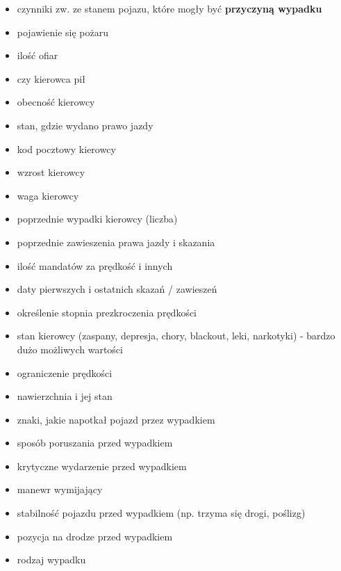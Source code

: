 \begin{itemize}
\item
  czynniki zw. ze stanem pojazu, które mogły być \textbf{przyczyną
  wypadku}\\
\item
  pojawienie się pożaru\\
\item
  ilość ofiar\\
\item
  czy kierowca pił\\
\item
  obecność kierowcy\\
\item
  stan, gdzie wydano prawo jazdy\\
\item
  kod pocztowy kierowcy\\
\item
  wzrost kierowcy\\
\item
  waga kierowcy\\
\item
  poprzednie wypadki kierowcy (liczba)\\
\item
  poprzednie zawieszenia prawa jazdy i skazania\\
\item
  ilość mandatów za prędkość i innych\\
\item
  daty pierwszych i ostatnich skazań / zawieszeń\\
\item
  określenie stopnia prezkroczenia prędkości\\
\item
  stan kierowcy (zaspany, depresja, chory, blackout, leki, narkotyki) -
  bardzo dużo możliwych wartości\\
\item
  ograniczenie prędkości\\
\item
  nawierzchnia i jej stan\\
\item
  znaki, jakie napotkał pojazd przez wypadkiem\\
\item
  sposób poruszania przed wypadkiem\\
\item
  krytyczne wydarzenie przed wypadkiem\\
\item
  manewr wymijający\\
\item
  stabilność pojazdu przed wypadkiem (np. trzyma się drogi, poślizg)\\
\item
  pozycja na drodze przed wypadkiem\\
\item
  rodzaj wypadku
\end{itemize}

